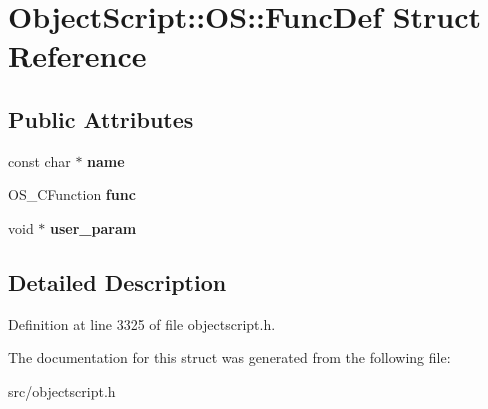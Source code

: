 \hypertarget{struct_object_script_1_1_o_s_1_1_func_def}{}\section{Object\+Script\+:\+:OS\+:\+:Func\+Def Struct Reference}
\label{struct_object_script_1_1_o_s_1_1_func_def}
\subsection*{Public Attributes}
\begin{DoxyCompactItemize}
\item 
const char $\ast$ {\bfseries name}\hypertarget{struct_object_script_1_1_o_s_1_1_func_def_a1b615ef35151cea7cd98595534585166}{}\label{struct_object_script_1_1_o_s_1_1_func_def_a1b615ef35151cea7cd98595534585166}

\item 
O\+S\+\_\+\+C\+Function {\bfseries func}\hypertarget{struct_object_script_1_1_o_s_1_1_func_def_ae19eba6844f0185d65d7529d7ae315e6}{}\label{struct_object_script_1_1_o_s_1_1_func_def_ae19eba6844f0185d65d7529d7ae315e6}

\item 
void $\ast$ {\bfseries user\+\_\+param}\hypertarget{struct_object_script_1_1_o_s_1_1_func_def_a6128a68c1b07dbe003859a5a27276e5b}{}\label{struct_object_script_1_1_o_s_1_1_func_def_a6128a68c1b07dbe003859a5a27276e5b}

\end{DoxyCompactItemize}


\subsection{Detailed Description}


Definition at line 3325 of file objectscript.\+h.



The documentation for this struct was generated from the following file\+:\begin{DoxyCompactItemize}
\item 
src/objectscript.\+h\end{DoxyCompactItemize}

